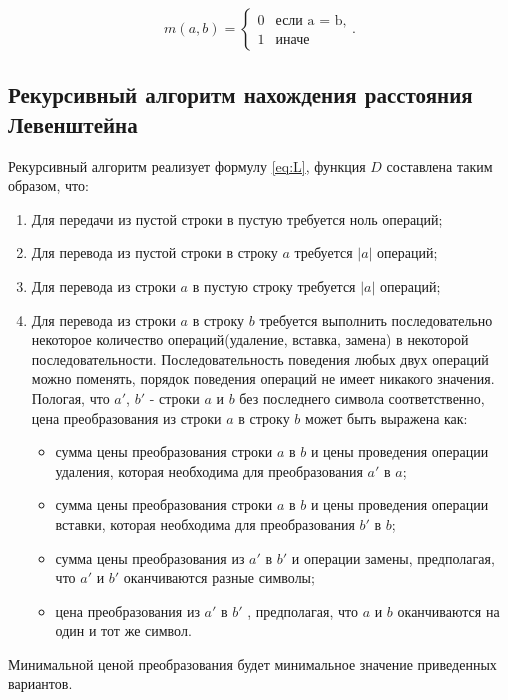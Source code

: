 \begin{equation}
	\label{eq:m}
	m(a, b) = \begin{cases}
		0 &\text{если a = b,}\\
		1 &\text{иначе}
	\end{cases}.
\end{equation}

\subsection{Рекурсивный алгоритм нахождения расстояния Левенштейна}

Рекурсивный алгоритм реализует формулу \ref{eq:L}, функция $D$ составлена таким образом, что:
\begin{enumerate}
	\item  Для передачи из пустой строки в пустую требуется ноль операций;
	\item Для перевода из пустой строки в строку $a$ требуется $|a|$ операций;
	\item Для перевода из строки $a$ в пустую строку требуется $|a|$ операций;
	\item Для перевода из строки $a$ в строку $b$ требуется выполнить последовательно некоторое количество операций(удаление, вставка, замена) в некоторой последовательности. Последовательность поведения любых двух операций можно поменять, порядок поведения операций не имеет никакого значения. Пологая, что $a'$, $b'$ - строки $a$ и $b$ без последнего символа соответственно, цена преобразования из строки $a$ в строку $b$ может быть выражена как:
	\begin{itemize}
		\item сумма цены преобразования строки $a$ в $b$ и цены проведения операции удаления, которая необходима для преобразования $a'$ в $a$;
		\item сумма цены преобразования строки $a$ в $b$ и цены проведения операции вставки, которая необходима для преобразования $b'$ в $b$;
		\item сумма цены преобразования из $a'$ в $b'$ и операции замены, предполагая, что $a'$ и $b'$ оканчиваются разные символы;
		\item цена преобразования из $a'$ в $b'$ , предполагая, что $a$ и $b$ оканчиваются на один и тот же символ.
	\end{itemize}
\end{enumerate}

Минимальной ценой преобразования будет минимальное значение приведенных вариантов.

